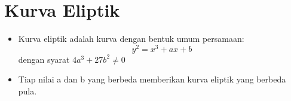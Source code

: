 \documentclass{article}
\begin{document}

\section*{Kurva Eliptik}

\begin{itemize}
    \item Kurva eliptik adalah kurva dengan bentuk umum persamaan:
    \[ y^2 = x^3 + ax + b \]
    dengan syarat $4a^3 + 27b^2 \neq 0$
    \item Tiap nilai a dan b yang berbeda memberikan kurva eliptik yang berbeda pula.
\end{itemize}
\end{document}
